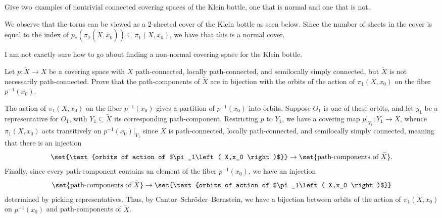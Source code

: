 \documentclass[10pt]{mypackage}
\begin{document}
\RaggedRight
\begin{problem}[Problem 1]
  Give two examples of nontrivial connected covering spaces of the Klein bottle, one that is normal and one that is not.
\end{problem}
\begin{solution}
  We observe that the torus can be viewed as a $2$-sheeted cover of the Klein bottle as seen below. Since the number of sheets in the cover is equal to the index of $p_{\ast}\left( \pi_1\left( \widetilde{X},\widetilde{x_0} \right) \right)\subseteq \pi_1\left( X,x_0 \right)$, we have that this is a normal cover.

  I am not exactly sure how to go about finding a non-normal covering space for the Klein bottle.
\end{solution}
\begin{problem}[Problem 2]
  Let $p\colon \widetilde{X}\rightarrow X$ be a covering space with $X$ path-connected, locally path-connected, and semilocally simply connected, but $\widetilde{X}$ is not necessarily path-connected. Prove that the path-components of $ \widetilde{X} $ are in bijection with the orbits of the action of $\pi_1\left( X,x_0 \right)$ on the fiber $p^{-1}\left( x_0 \right)$.
\end{problem}
\begin{solution}
  The action of $\pi_1\left( X,x_0 \right)$ on the fiber $p^{-1}\left( x_0 \right)$ gives a partition of $p^{-1}\left( x_0 \right)$ into orbits. Suppose $O_1$ is one of these orbits, and let $y_1$ be a representative for $O_1$, with $Y_1\subseteq \widetilde{X}$ its corresponding path-component. Restricting $p$ to $Y_1$, we have a covering map $p|_{Y_1}\colon Y_1\rightarrow X$, whence $\pi_1\left( X,x_0 \right)$ acts transitively on $p^{-1}\left( x_0 \right)|_{Y_1}$ since $X$ is path-connected, locally path-connected, and semilocally simply connected, meaning that there is an injection
  \begin{align*}
    \set{\text{orbits of action of $\pi_1\left( X,x_0 \right)$}} \rightarrow \set{\text{path-components of }\widetilde{X}}.
  \end{align*}
  Finally, since every path-component contains an element of the fiber $ p^{-1}\left( x_0 \right) $, we have an injection
  \begin{align*}
    \set{\text{path-components of }\widetilde{X}}\rightarrow \set{\text{orbits of action of $\pi_1\left( X,x_0 \right)$}}
  \end{align*}
  determined by picking representatives. Thus, by Cantor--Schröder--Bernstein, we have a bijection between orbits of the action of $\pi_1\left( X,x_0 \right)$ on $p^{-1}\left( x_0 \right)$ and path-components of $ \widetilde{X} $.
\end{solution}
\end{document}
